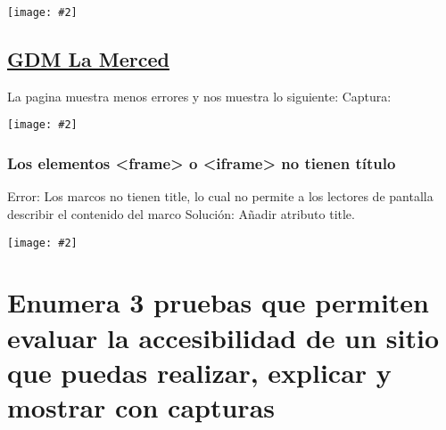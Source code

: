 \documentclass[a4paper,12pt]{article} %
\newcommand{\image}[2][1]{\texttt{[image: \#2]}}
\begin{document}
\image{9}


\subsection{\href{https://gdmlamerced.com}{GDM La Merced}}
La pagina muestra menos errores y nos muestra lo siguiente:
Captura:

\image{7}

\subsubsection{Los elementos <frame> o <iframe> no tienen título}
Error: Los marcos no tienen title, lo cual no permite a los lectores de pantalla describir el contenido del marco
Solución: Añadir atributo title.

\image{8}


\section{Enumera 3 pruebas que permiten evaluar la accesibilidad de un sitio que puedas realizar, explicar y mostrar con capturas}
\end{document}
